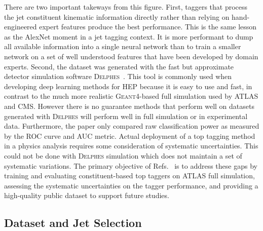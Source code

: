 There are two important takeways from this figure.
First, taggers that process the jet constituent kinematic information directly rather than relying on hand-engineered expert features produce the best performance.
This is the same lesson as the AlexNet moment in a jet tagging context.
It is more performant to dump all available information into a single neural network than to train a smaller network on a set of well understood features that have been developed by domain experts.
Second, the dataset was generated with the fast but approximate detector simulation software \textsc{Delphes}~\cite{deFavereau:2013fsa}.
This tool is commonly used when developing deep learning methods for HEP because it is easy to use and fast, in contrast to the much more realistic \textsc{Geant4}-based full simulation used by ATLAS and CMS.
However there is no guarantee methods that perform well on datasets generated with \textsc{Delphes} will perform well in full simulation or in experimental data.
Furthermore, the paper only compared raw classification power as measured by the ROC curve and AUC metric.
Actual deployment of a top tagging method in a physics analysis requires some consideration of systematic uncertainties.
This could not be done with \textsc{Delphes} simulation which does not maintain a set of systematic variations.
The primary objective of Refs.~\cite{ATLAS:2022qby, ATLAS:2024rua} is to address these gaps by training and evaluating constituent-based top taggers on ATLAS full simulation, assessing the systematic uncertainties on the tagger performance, and providing a high-quality public dataset to support future studies.

\FloatBarrier

\subsection{Dataset and Jet Selection}

